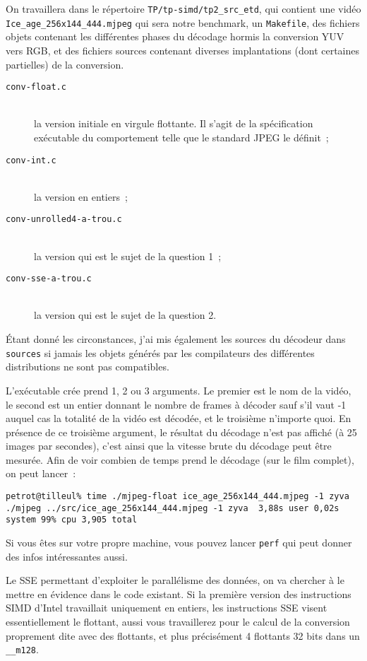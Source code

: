 \documentclass[a4paper,12pt]{article}
\begin{document}
On travaillera dans le répertoire \lstinline{TP/tp-simd/tp2_src_etd}, qui contient une vidéo \lstinline{Ice_age_256x144_444.mjpeg} qui sera notre benchmark, un \lstinline{Makefile}, des fichiers objets contenant les différentes phases du décodage hormis la conversion YUV vers RGB, et des fichiers sources contenant diverses implantations (dont certaines partielles) de la conversion.
\begin{description}
\item[\texttt{conv-float.c}]~\\
     la version initiale en virgule flottante.
     Il s'agit de la spécification exécutable du comportement telle que le standard JPEG le définit~;
\item[\texttt{conv-int.c}]~\\
     la version en entiers~;
\item[\texttt{conv-unrolled4-a-trou.c}]~\\
     la version qui est le sujet de la question 1~;
\item[\texttt{conv-sse-a-trou.c}]~\\
     la version qui est le sujet de la question 2.
\end{description}

Étant donné les circonstances, j'ai mis également les sources du décodeur dans \texttt{sources} si jamais les objets générés par les compilateurs des différentes distributions ne sont pas compatibles.

L'exécutable crée prend 1, 2 ou 3 arguments.
Le premier est le nom de la vidéo, le second est un entier donnant le nombre de frames à décoder sauf s'il vaut -1 auquel cas la totalité de la vidéo est décodée, et le troisième n'importe quoi.
En présence de ce troisième argument, le résultat du décodage n'est pas affiché (à 25 images par secondes), c'est ainsi que la vitesse brute du décodage peut être mesurée. 
Afin de voir combien de temps prend le décodage (sur le film complet), on peut lancer~:
\small
\begin{verbatim}
petrot@tilleul% time ./mjpeg-float ice_age_256x144_444.mjpeg -1 zyva
./mjpeg ../src/ice_age_256x144_444.mjpeg -1 zyva  3,88s user 0,02s system 99% cpu 3,905 total
\end{verbatim}
\normalsize

Si vous êtes sur votre propre machine, vous pouvez lancer \texttt{perf} qui peut donner des infos intéressantes aussi.

Le SSE permettant d'exploiter le parallélisme des données, on va chercher à le mettre en évidence dans le code existant.
Si la première version des instructions SIMD d'Intel travaillait uniquement en entiers, les instructions SSE visent essentiellement le flottant, aussi vous travaillerez pour le calcul de la conversion proprement dite avec des flottants, et plus précisément 4 flottants 32 bits dans un \lstinline{__m128}. 
\end{document}
